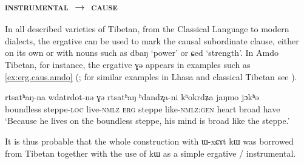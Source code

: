 \documentclass[oldfontcommands,oneside,a4paper,11pt]{article}
\newcommand{\ipa}[1]{{\phon #1}} %
\begin{document}
% 
 

 \subsubsection{\textsc{instrumental} $\rightarrow$ \textsc{cause}} \label{sec:instr2cause}

In all described varieties of Tibetan, from the Classical Language to modern dialects, the ergative can be used to mark the causal subordinate clause, either on its own or with nouns such as \ipa{dbaŋ} `power' or \ipa{ɕed} `strength'. In Amdo Tibetan, for instance, the ergative \ipa{ɣə} appears in examples such as \ref{ex:erg.caus.amdo} (\citealt[271-272]{vbrugmo03maqu}; for similar examples in Lhasa and classical Tibetan see \citealt[129]{tounadre96erg}).
 \begin{exe} 
\ex \label{ex:erg.caus.amdo}
\gll  \ipa{kʰokjaŋwi} 	\ipa{rtsatʰaŋ-na} 	\ipa{wdatrdot-nə} 	\ipa{ɣə} 	\ipa{rtsatʰaŋ} 	\ipa{ʰdandʐa-ni} 	\ipa{kʰokrdʑa} 	\ipa{jaŋmo} 	\ipa{jɔkʰə}  \\
boundless steppe-\textsc{loc} live-\textsc{nmlz} \textsc{erg} steppe like-\textsc{nmlz:gen} heart broad have \\
\glt  `Because he lives on the boundless steppe, his mind is broad like the steppe.'
\end{exe}  
 
It is thus probable that the whole construction with \ipa{ɯ-xɕɤt kɯ} was borrowed from Tibetan together with the use of \ipa{kɯ} as a simple ergative / instrumental.
\end{document}
